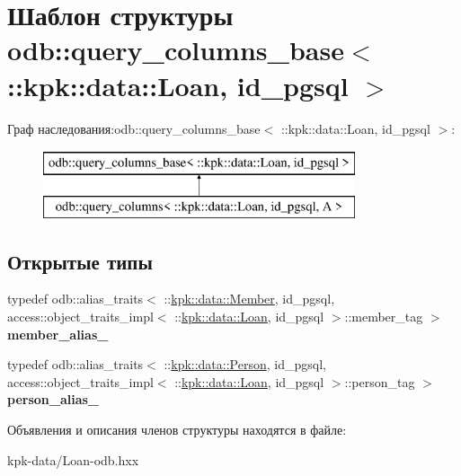 \hypertarget{structodb_1_1query__columns__base_3_01_1_1kpk_1_1data_1_1_loan_00_01id__pgsql_01_4}{}\section{Шаблон структуры odb\+:\+:query\+\_\+columns\+\_\+base$<$ \+:\+:kpk\+:\+:data\+:\+:Loan, id\+\_\+pgsql $>$}
\label{structodb_1_1query__columns__base_3_01_1_1kpk_1_1data_1_1_loan_00_01id__pgsql_01_4}
Граф наследования\+:odb\+:\+:query\+\_\+columns\+\_\+base$<$ \+:\+:kpk\+:\+:data\+:\+:Loan, id\+\_\+pgsql $>$\+:\begin{figure}[H]
\begin{center}
\leavevmode
\includegraphics[height=2.000000cm]{structodb_1_1query__columns__base_3_01_1_1kpk_1_1data_1_1_loan_00_01id__pgsql_01_4}
\end{center}
\end{figure}
\subsection*{Открытые типы}
\begin{DoxyCompactItemize}
\item 
typedef odb\+::alias\+\_\+traits$<$ \+::\hyperlink{classkpk_1_1data_1_1_member}{kpk\+::data\+::\+Member}, id\+\_\+pgsql, access\+::object\+\_\+traits\+\_\+impl$<$ \+::\hyperlink{classkpk_1_1data_1_1_loan}{kpk\+::data\+::\+Loan}, id\+\_\+pgsql $>$\+::member\+\_\+tag $>$ {\bfseries member\+\_\+alias\+\_\+}\hypertarget{structodb_1_1query__columns__base_3_01_1_1kpk_1_1data_1_1_loan_00_01id__pgsql_01_4_ac95b425628eaa04008bcc53ece39cac6}{}\label{structodb_1_1query__columns__base_3_01_1_1kpk_1_1data_1_1_loan_00_01id__pgsql_01_4_ac95b425628eaa04008bcc53ece39cac6}

\item 
typedef odb\+::alias\+\_\+traits$<$ \+::\hyperlink{classkpk_1_1data_1_1_person}{kpk\+::data\+::\+Person}, id\+\_\+pgsql, access\+::object\+\_\+traits\+\_\+impl$<$ \+::\hyperlink{classkpk_1_1data_1_1_loan}{kpk\+::data\+::\+Loan}, id\+\_\+pgsql $>$\+::person\+\_\+tag $>$ {\bfseries person\+\_\+alias\+\_\+}\hypertarget{structodb_1_1query__columns__base_3_01_1_1kpk_1_1data_1_1_loan_00_01id__pgsql_01_4_a7064e13b6a5dd8c5f04a97fcab26e761}{}\label{structodb_1_1query__columns__base_3_01_1_1kpk_1_1data_1_1_loan_00_01id__pgsql_01_4_a7064e13b6a5dd8c5f04a97fcab26e761}

\end{DoxyCompactItemize}


Объявления и описания членов структуры находятся в файле\+:\begin{DoxyCompactItemize}
\item 
kpk-\/data/Loan-\/odb.\+hxx\end{DoxyCompactItemize}

